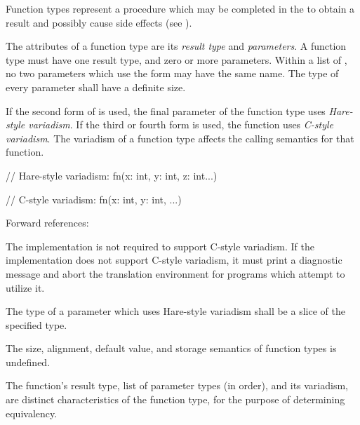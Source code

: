 \specsubsubitem
Function types represent a procedure which may be completed in the
 to obtain a result and possibly cause side
effects (see ).

\specsubsubitem
The attributes of a function type are its \textit{result type} and
\textit{parameters}. A function type must have one result type, and zero or more
parameters. Within a list of , no two parameters which
use the  form may have the same name. The type of every
parameter shall have a definite size.

\specsubsubitem
If the second form of  is used, the final parameter of
the function type uses \textit{Hare-style variadism}. If the third or fourth
form is used, the function uses \textit{C-style variadism}. The variadism of a
function type affects the calling semantics for that function.

\begin{codesample}
// Hare-style variadism:
fn(x: int, y: int, z: int...)

// C-style variadism:
fn(x: int, y: int, ...)
\end{codesample}

Forward references: 

\specsubsubitem
The implementation is not required to support C-style variadism. If the
implementation does not support C-style variadism, it must print a diagnostic
message and abort the translation environment for programs which attempt to
utilize it.

\specsubsubitem
The type of a parameter which uses Hare-style variadism shall be a slice of the
specified type.


\specsubsubitem
The size, alignment, default value, and storage semantics of function types is
undefined.

\specsubsubitem
The function's result type, list of parameter types (in order), and its
variadism, are distinct characteristics of the function type, for the purpose of
determining equivalency.


\begin{grammar}
 \\
	 \\

 \\
	  \\
\end{grammar}

